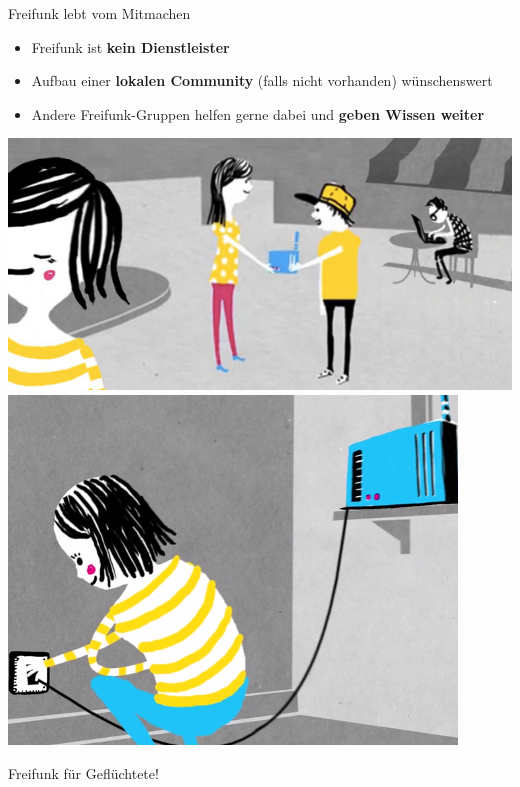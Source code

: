 \documentclass[t]{beamer}
\begin{document}
  \begin{frame}{Freifunk lebt vom Mitmachen}
    \begin{itemize}
      \item Freifunk ist \textbf{kein Dienstleister}
      \item Aufbau einer \textbf{lokalen Community} (falls nicht vorhanden) wünschenswert
      \item Andere Freifunk-Gruppen helfen gerne dabei und \textbf{geben Wissen weiter}
    \end{itemize}
    \begin{center}
      \includegraphics[height=0.28\textheight]{images/router}
      \hspace{0.5em}
      \includegraphics[height=0.28\textheight]{images/setup}
    \end{center}
  \end{frame}

  \begin{frame}
    \huge
    \vspace{3em}
    \center
    Freifunk für Geflüchtete!
  \end{frame}
\end{document}
